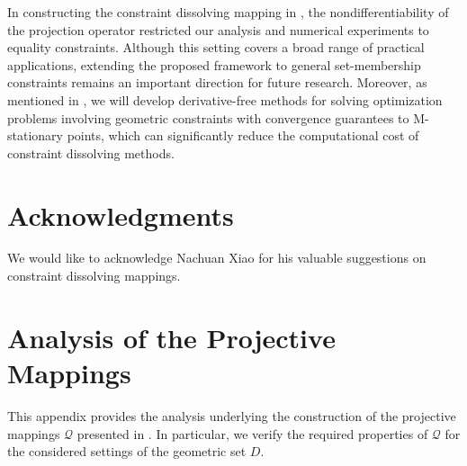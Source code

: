 \documentclass[11pt,a4paper,reqno]{amsart}
\begin{document}
{In constructing the constraint dissolving mapping in , the nondifferentiability of the projection operator restricted our analysis and numerical experiments to equality constraints. Although this setting covers a broad range of practical applications, extending the proposed framework to general set-membership constraints remains an important direction for future research. Moreover, as mentioned in , we will develop derivative-free methods for solving optimization problems involving geometric constraints with convergence guarantees to M-stationary points, which can significantly reduce the computational cost of constraint dissolving methods.



\section*{Acknowledgments}
We would like to acknowledge Nachuan Xiao for his valuable suggestions on constraint dissolving mappings.

\appendix  \label{App:1}
\section{Analysis of the Projective Mappings}
This appendix provides the analysis underlying the construction of the projective mappings $\mathcal Q$ presented in . In particular, we verify the required properties of $\mathcal Q$ for the considered settings of the geometric set $D$.

}
\end{document}
